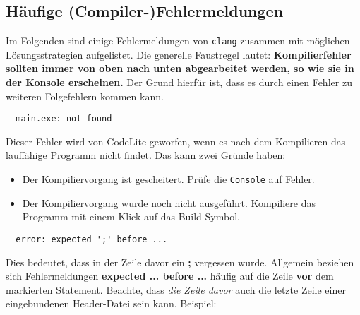 
\subsection*{Häufige (Compiler-)Fehlermeldungen}

Im Folgenden sind einige Fehlermeldungen von \texttt{clang} zusammen mit möglichen Lösungsstrategien aufgelistet.
Die generelle Faustregel lautet: 
\textbf{Kompilierfehler sollten immer von oben nach unten abgearbeitet werden, so wie sie in der Konsole erscheinen.}
Der Grund hierfür ist, dass es durch einen Fehler zu weiteren Folgefehlern kommen kann.


\begin{verbatim}
  main.exe: not found
\end{verbatim}

Dieser Fehler wird von CodeLite geworfen, wenn es nach dem Kompilieren das lauffähige Programm nicht findet.
Das kann zwei Gründe haben:
\begin{itemize}
\item Der Kompiliervorgang ist gescheitert. Prüfe die \texttt{Console} auf Fehler.
\item Der Kompiliervorgang wurde noch nicht ausgeführt. Kompiliere das Programm mit einem Klick auf das Build-Symbol.
\end{itemize}

\begin{verbatim}
  error: expected ';' before ...
\end{verbatim}

Dies bedeutet, dass in der Zeile davor ein \textbf{;} vergessen wurde.
Allgemein beziehen sich Fehlermeldungen \textbf{expected ... before ...} häufig auf die Zeile \textbf{vor} dem markierten Statement.
Beachte, dass \emph{die Zeile davor} auch die letzte Zeile einer eingebundenen Header-Datei sein kann. Beispiel:


